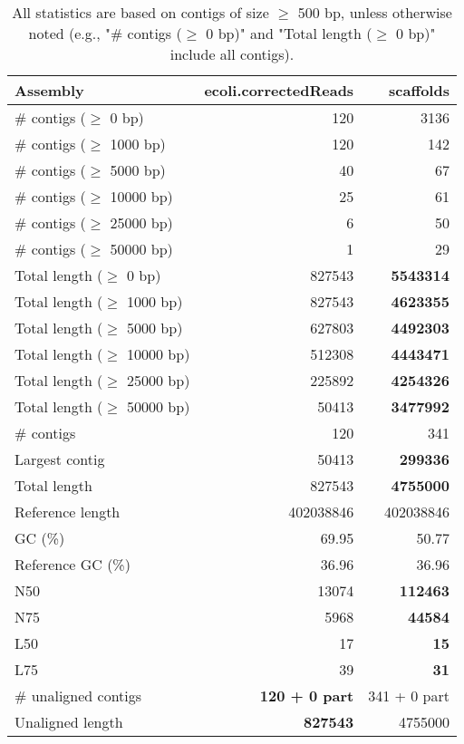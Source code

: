 \documentclass[12pt,a4paper]{article}
\begin{document}
\begin{table}[ht]
\begin{center}
\caption{All statistics are based on contigs of size $\geq$ 500 bp, unless otherwise noted (e.g., "\# contigs ($\geq$ 0 bp)" and "Total length ($\geq$ 0 bp)" include all contigs).}
\begin{tabular}{|l*{2}{|r}|}
\hline
Assembly & ecoli.correctedReads & scaffolds \\ \hline
\# contigs ($\geq$ 0 bp) & 120 & 3136 \\ \hline
\# contigs ($\geq$ 1000 bp) & 120 & 142 \\ \hline
\# contigs ($\geq$ 5000 bp) & 40 & 67 \\ \hline
\# contigs ($\geq$ 10000 bp) & 25 & 61 \\ \hline
\# contigs ($\geq$ 25000 bp) & 6 & 50 \\ \hline
\# contigs ($\geq$ 50000 bp) & 1 & 29 \\ \hline
Total length ($\geq$ 0 bp) & 827543 & {\bf 5543314} \\ \hline
Total length ($\geq$ 1000 bp) & 827543 & {\bf 4623355} \\ \hline
Total length ($\geq$ 5000 bp) & 627803 & {\bf 4492303} \\ \hline
Total length ($\geq$ 10000 bp) & 512308 & {\bf 4443471} \\ \hline
Total length ($\geq$ 25000 bp) & 225892 & {\bf 4254326} \\ \hline
Total length ($\geq$ 50000 bp) & 50413 & {\bf 3477992} \\ \hline
\# contigs & 120 & 341 \\ \hline
Largest contig & 50413 & {\bf 299336} \\ \hline
Total length & 827543 & {\bf 4755000} \\ \hline
Reference length & 402038846 & 402038846 \\ \hline
GC (\%) & 69.95 & 50.77 \\ \hline
Reference GC (\%) & 36.96 & 36.96 \\ \hline
N50 & 13074 & {\bf 112463} \\ \hline
N75 & 5968 & {\bf 44584} \\ \hline
L50 & 17 & {\bf 15} \\ \hline
L75 & 39 & {\bf 31} \\ \hline
\# unaligned contigs & {\bf 120 + 0 part} & 341 + 0 part \\ \hline
Unaligned length & {\bf 827543} & 4755000 \\ \hline

\end{tabular}
\end{center}
\end{table}
\end{document}
